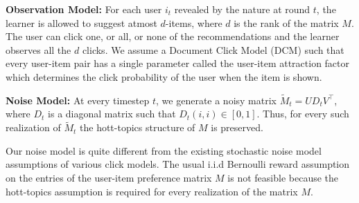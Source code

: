 

\textbf{Observation Model:} For each user $i_t$ revealed by the nature at round $t$, the learner is allowed to suggest atmost $d$-items, where $d$ is the rank of the matrix $M$. The user can click one, or all, or none of the recommendations and the learner observes all the $d$ clicks. We assume a Document Click Model (DCM) \citep{craswell2008experimental} such that every user-item pair has a single parameter called the user-item attraction factor which determines the click probability of the user when the item is shown.  

\textbf{Noise Model:}  At every timestep $t$, we generate a noisy matrix $\tilde{M}_t = UD_t V^{\intercal}$, where $D_t$ is a diagonal matrix such that $D_t(i,i)\in[0,1]$. Thus, for every such realization of $\tilde{M}_t$  the hott-topics structure of $M$ is preserved. 


\begin{discussion}
Our noise model is quite different from the existing stochastic noise model assumptions of various click models. The usual i.i.d Bernoulli reward assumption on the entries of the user-item preference matrix $M$ is not feasible because the hott-topics assumption is required for every realization of the matrix $M$. 
\end{discussion}

